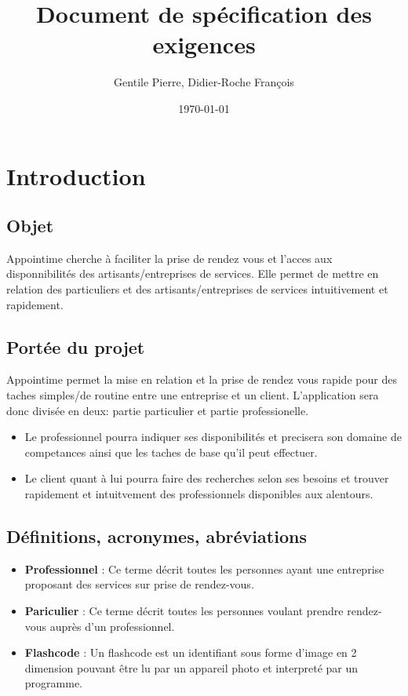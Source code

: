 \documentclass{article}
\author{Gentile Pierre, Didier-Roche François}
\date{\today}
\title{Document de spécification des exigences}
\begin{document}
\maketitle

\newpage
\tableofcontents
\newpage


\section{Introduction}
\subsection{Objet}
Appointime cherche à faciliter la prise de rendez vous et l’acces aux disponnibilités des artisants/entreprises de services.
Elle permet de mettre en relation des particuliers et des artisants/entreprises de services intuitivement et rapidement.
\subsection{Portée du projet}
Appointime permet la mise en relation et la prise de rendez vous rapide pour des taches simples/de routine entre une entreprise et un client.
L’application sera donc divisée en deux: partie particulier et partie professionelle.
\begin{itemize}
\item Le professionnel pourra indiquer ses disponibilités et precisera son domaine de competances ainsi que les taches de base qu’il peut effectuer.
\item Le client quant à lui pourra faire des recherches selon ses
  besoins et trouver rapidement et intuitvement des professionnels
  disponibles aux alentours.
\end{itemize}
\subsection{Définitions, acronymes, abréviations}
\begin{itemize}
\item \textbf{Professionnel} : Ce terme décrit toutes les personnes ayant une entreprise proposant des
  services sur prise de rendez-vous.
\item \textbf{Pariculier} : Ce terme décrit toutes les personnes
  voulant prendre rendez-vous auprès d'un professionnel.
\item \textbf{Flashcode} : Un flashcode est un identifiant sous forme
  d'image en 2 dimension pouvant être lu par un appareil photo et
  interpreté par un programme.

\end{itemize}
\end{document}
